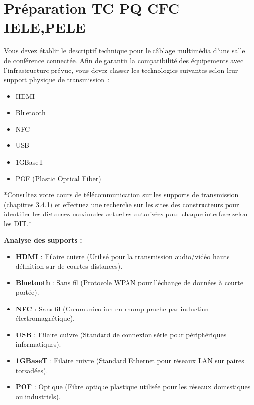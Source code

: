 \documentclass[a4paper,11pt,answers,addpoints]{exam}
\begin{document}
	\unframedsolutions
	\pointsinmargin
	\bracketedpoints
	
\section*{Préparation TC PQ CFC IELE,PELE}
\begin{questions}
\question 
Vous devez établir le descriptif technique pour le câblage multimédia d'une salle de conférence connectée. Afin de garantir la compatibilité des équipements avec l'infrastructure prévue, vous devez classer les technologies suivantes selon leur support physique de transmission~:
\begin{itemize}
	\item HDMI
	\item Bluetooth
	\item NFC
	\item USB
	\item 1GBaseT
	\item POF (Plastic Optical Fiber)
\end{itemize}

*Consultez votre cours de télécommunication sur les supports de transmission (chapitres 3.4.1) et effectuez une recherche sur les sites des constructeurs pour identifier les distances maximales actuelles autorisées pour chaque interface selon les DIT.*

\begin{solution}
	\textbf{Analyse des supports :}
	\begin{itemize}
		\item \textbf{HDMI} : Filaire cuivre (Utilisé pour la transmission audio/vidéo haute définition sur de courtes distances).
		\item \textbf{Bluetooth} : Sans fil (Protocole WPAN pour l'échange de données à courte portée).
		\item \textbf{NFC} : Sans fil (Communication en champ proche par induction électromagnétique).
		\item \textbf{USB} : Filaire cuivre (Standard de connexion série pour périphériques informatiques).
		\item \textbf{1GBaseT} : Filaire cuivre (Standard Ethernet pour réseaux LAN sur paires torsadées).
		\item \textbf{POF} : Optique (Fibre optique plastique utilisée pour les réseaux domestiques ou industriels).
	\end{itemize}
	\end{solution}
\end{questions}
\end{document}
